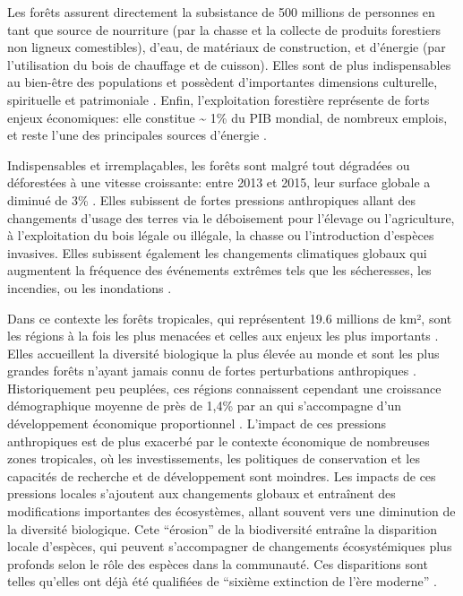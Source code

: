 \documentclass[
  11pt,
  french,
  A4paper,
  extrafontsizes,onecolumn,openright
  ]{memoir}
\begin{document}
Les forêts assurent directement la subsistance de 500 millions de
personnes en tant que source de nourriture (par la chasse et la collecte
de produits forestiers non ligneux comestibles), d'eau, de matériaux de
construction, et d'énergie (par l'utilisation du bois de chauffage et de
cuisson). Elles sont de plus indispensables au bien-être des populations
et possèdent d'importantes dimensions culturelle, spirituelle et
patrimoniale \autocites{FRA2015}{Tilman2014}. Enfin, l'exploitation
forestière représente de forts enjeux économiques: elle constitue
\textasciitilde{} 1\% du PIB mondial, de nombreux emplois, et reste
l'une des principales sources d'énergie
\autocites{CBDdiversity2011}{FAO2014}.

Indispensables et irremplaçables, les forêts sont malgré tout dégradées
ou déforestées à une vitesse croissante: entre 2013 et 2015, leur
surface globale a diminué de 3\% \autocite{FAO2009}. Elles subissent de
fortes pressions anthropiques allant des changements d'usage des terres
via le déboisement pour l'élevage ou l'agriculture, à l'exploitation du
bois légale ou illégale, la chasse ou l'introduction d'espèces
invasives. Elles subissent également les changements climatiques globaux
qui augmentent la fréquence des événements extrêmes tels que les
sécheresses, les incendies, ou les inondations
\autocite{Pachauri2014}.\newline

Dans ce contexte les forêts tropicales, qui représentent 19.6 millions
de km², sont les régions à la fois les plus menacées et celles aux
enjeux les plus importants \autocite{Barlow2018}. Elles accueillent la
diversité biologique la plus élevée au monde et sont les plus grandes
forêts n'ayant jamais connu de fortes perturbations anthropiques
\autocites{Gentry1988}{FAO2011}. Historiquement peu peuplées, ces
régions connaissent cependant une croissance démographique moyenne de
près de 1,4\% par an qui s'accompagne d'un développement économique
proportionnel \autocite{Asner2009}. L'impact de ces pressions
anthropiques est de plus exacerbé par le contexte économique de
nombreuses zones tropicales, où les investissements, les politiques de
conservation et les capacités de recherche et de développement sont
moindres. Les impacts de ces pressions locales s'ajoutent aux
changements globaux et entraînent des modifications importantes des
écosystèmes, allant souvent vers une diminution de la diversité
biologique. Cete ``érosion'' de la biodiversité entraîne la disparition
locale d'espèces, qui peuvent s'accompagner de changements
écosystémiques plus profonds selon le rôle des espèces dans la
communauté. Ces disparitions sont telles qu'elles ont déjà été
qualifiées de ``sixième extinction de l'ère moderne''
\autocites{Vitousek1997}{Cardinale2012}.
\end{document}
